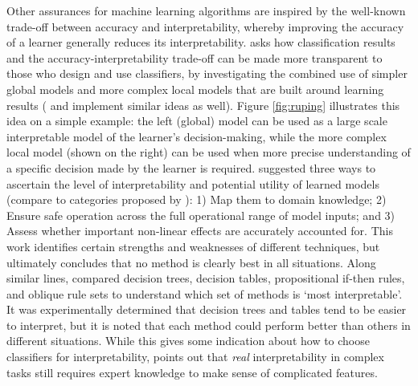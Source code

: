 Other assurances for machine learning algorithms are inspired by the well-known trade-off between accuracy and interpretability, whereby improving the accuracy of a learner generally reduces its interpretability. \citet{Ruping2006-xj} asks how classification results and the accuracy-interpretability trade-off can be made more transparent to those who design and use classifiers, by investigating the combined use of simpler global models and more complex local models that are built around learning results (\citet{Otte2013-oo} and \citet{Ribeiro2016-uc} implement similar ideas as well). 
Figure \ref{fig:ruping} illustrates this idea on a simple example: the left (global) model can be used as a large scale interpretable model of the learner's decision-making, while the more complex local model (shown on the right) can be used when more precise understanding of a specific decision made by the learner is required. 
\citet{Van_Belle2013-ph} suggested three ways to ascertain the level of interpretability and potential utility of learned models (compare to categories proposed by \citet{Lipton2016-ug}): 1) Map them to domain knowledge; 2) Ensure safe operation across the full operational range of model inputs; and 3) Assess whether important non-linear effects are accurately accounted for. 
This work identifies certain strengths and weaknesses of different techniques, but ultimately concludes that no method is clearly best in all situations. 
Along similar lines, \citet{Huysmans2011-th} compared decision trees, decision tables, propositional if-then rules, and oblique rule sets to understand which set of methods is `most interpretable'. 
It was experimentally determined that decision trees and tables tend to be easier to interpret, but it is noted that each method could perform better than others in different situations. 
While this gives some indication about how to choose classifiers for interpretability, \citeauthor{Park2016-ld} %
points out that \emph{real} interpretability in complex tasks still requires expert knowledge to make sense of complicated features. 
